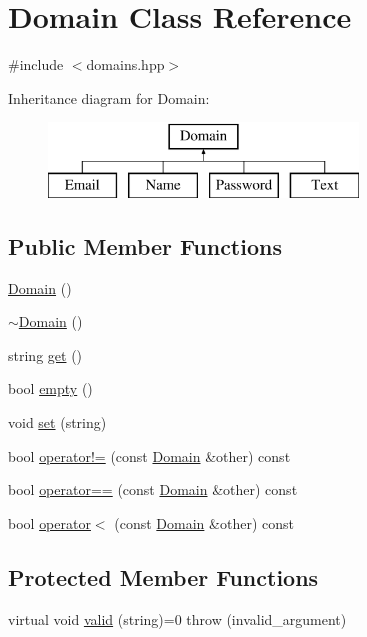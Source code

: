 \hypertarget{class_domain}{}\section{Domain Class Reference}
\label{class_domain}


{\ttfamily \#include $<$domains.\+hpp$>$}

Inheritance diagram for Domain\+:\begin{figure}[H]
\begin{center}
\leavevmode
\includegraphics[height=2.000000cm]{class_domain}
\end{center}
\end{figure}
\subsection*{Public Member Functions}
\begin{DoxyCompactItemize}
\item 
\hyperlink{class_domain_a6adccae537e53d4fde2b70f875e6b8d0}{Domain} ()
\item 
\hyperlink{class_domain_a29cec9afb2e54c810ba1f3c1a49543a8}{$\sim$\+Domain} ()
\item 
string \hyperlink{class_domain_a265e5167062bf41ec78e4245af288c33}{get} ()
\item 
bool \hyperlink{class_domain_ae36e552d1a3bde70b7f448de345a3c9d}{empty} ()
\item 
void \hyperlink{class_domain_a629126b8c9a6a749d30745bde230c4ee}{set} (string)
\item 
bool \hyperlink{class_domain_a2791934de616d1bddcd93206b132c323}{operator!=} (const \hyperlink{class_domain}{Domain} \&other) const
\item 
bool \hyperlink{class_domain_acd0015ed9d54a761f7fca726fa53b541}{operator==} (const \hyperlink{class_domain}{Domain} \&other) const
\item 
bool \hyperlink{class_domain_ac165cf81dfabb07fbfdf0559525fc773}{operator$<$} (const \hyperlink{class_domain}{Domain} \&other) const
\end{DoxyCompactItemize}
\subsection*{Protected Member Functions}
\begin{DoxyCompactItemize}
\item 
virtual void \hyperlink{class_domain_a6a4590a4c94ae7be6f4f0da9703fb6d6}{valid} (string)=0  throw (invalid\+\_\+argument)
\end{DoxyCompactItemize}
